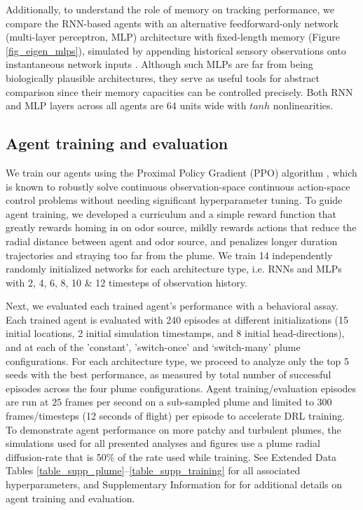\documentclass[5p,twocolumn,authoryear]{elsarticle}
\begin{document}
Additionally, to understand the role of memory on tracking performance, we compare the RNN-based agents with an alternative feedforward-only network (multi-layer perceptron, MLP) architecture with fixed-length memory (Figure \ref{fig_eigen_mlps}), simulated by appending historical sensory observations onto instantaneous network inputs \citep{mnih2013playing}.
Although such MLPs are far from being biologically plausible architectures, they serve as useful tools for abstract comparison since their memory capacities can be controlled precisely. 
Both RNN and MLP layers across all agents are 64 units wide with $tanh$ nonlinearities.


\subsection*{Agent training and evaluation}
\label{sec_methods_train_eval}
We train our agents using the Proximal Policy Gradient (PPO) algorithm  \citep{schulman2017proximal}, which is known to robustly solve continuous observation-space continuous action-space control problems without needing significant hyperparameter tuning.  
To guide agent training, we developed a curriculum and a simple reward function that greatly rewards homing in on odor source, mildly rewards actions that reduce the radial distance between agent and odor source, and penalizes longer duration trajectories and straying too far from the plume. 
We train 14 independently randomly initialized networks for each architecture type, i.e. RNNs and MLPs with 2, 4, 6, 8, 10 \& 12 timesteps of observation history.

Next, we evaluated each trained agent's performance with a behavioral assay. 
Each trained agent is evaluated with 240 episodes at different initializations (15 initial locations, 2 initial simulation timestamps, and 8 initial head-directions), and at each of the 'constant', 'switch-once' and `switch-many' plume configurations.
For each architecture type, we proceed to analyze only the top 5 seeds with the best performance, as measured by total number of successful episodes across the four plume configurations.
Agent training/evaluation episodes are run at $25$ frames per second on a sub-sampled plume and limited to 300 frames/timesteps (12 seconds of flight) per episode to accelerate DRL training.
To demonstrate agent performance on more patchy and turbulent plumes, the simulations used for all presented analyses and figures use a plume radial diffusion-rate that is 50\% of the rate used while training. 
See Extended Data Tables \ref{table_supp_plume}--\ref{table_supp_training} for all associated hyperparameters, and Supplementary Information for for additional details on agent training and evaluation.
\end{document}
